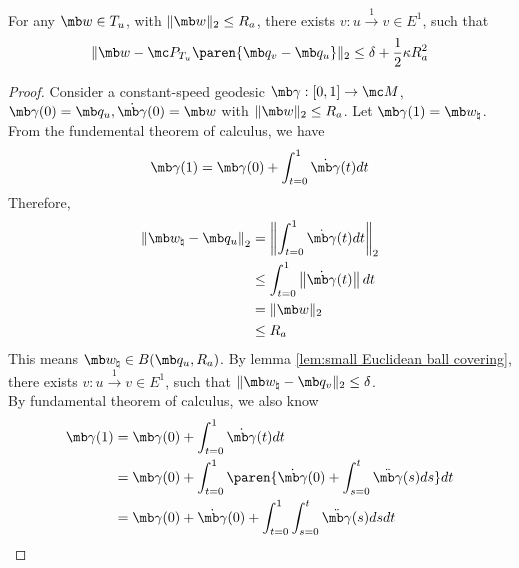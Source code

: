 \begin{lemma}\label{lem:tangent space covering}
 For any $\mb w \in T_u$, with $\| \mb w \|_2 \leq R_a$, there exists $v: u \overset{1}{\rightarrow} v \in E^1$, such that 
 \begin{equation}
     \| \mb w - \mc P_{T_u} \paren{\mb q_v - \mb q_u}\|_2
     \leq \delta + \frac{1}{2} \kappa R_a^2
 \end{equation}
\end{lemma}

\begin{proof}
    Consider a constant-speed geodesic $\mb \gamma: [0,1] \rightarrow \mc M$, $\mb \gamma(0)=\mb q_u, \dot{\mb \gamma}(0) =\mb w$ with $\| \mb w \|_2 \leq R_a$. Let $\mb \gamma(1)= \mb w_\natural$.
From the fundemental theorem of calculus, we have
\begin{equation}
    \begin{aligned}
        \mb \gamma(1) = \mb \gamma(0) + \int_{t=0}^1 \dot{\mb \gamma}(t) dt
    \end{aligned}
\end{equation}
Therefore,
\begin{equation}
    \begin{aligned}
       \left\| \mb w_\natural - \mb q_u \right\|_2 
        &= \left\| \int_{t=0}^1 \dot{\mb \gamma}(t) dt \right\|_2\\
        &\leq \int_{t=0}^1 \left\| \dot{\mb \gamma}(t)\right\| dt\\
        &= \| \mb w \|_2\\
        &\leq R_a
    \end{aligned}
\end{equation}
This means $\mb w_\natural \in B(\mb q_u, R_a)$. By lemma \ref{lem:small Euclidean ball covering}, there exists $v: u \overset{1}{\rightarrow} v \in E^1$, such that $\| \mb w_\natural - \mb q_v \|_2 \leq \delta$.\\
By fundamental theorem of calculus, we also know
\begin{equation}\label{eq:geodesic taylor expansion}
    \begin{aligned}
    \mb \gamma(1) 
    &= \mb \gamma(0) + \int_{t=0}^1 \dot{\mb \gamma}(t) dt\\
    &= \mb \gamma(0) + \int_{t=0}^1 \paren{ \dot{\mb \gamma}(0) + \int_{s=0}^t \ddot{\mb \gamma}(s) ds } dt\\
    &= \mb \gamma(0) + \dot{\mb \gamma}(0) + \int_{t=0}^1 \int_{s=0}^t \ddot{\mb\gamma}(s) ds dt
    \end{aligned}

\end{equation}
\end{proof}
